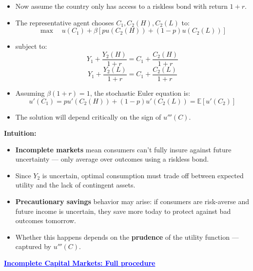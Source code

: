 \documentclass[12pt]{article}
\begin{document}
\begin{itemize}
    \item Now assume the country only has access to a riskless bond with return $1 + r$.
    \item The representative agent chooses $C_1, C_2(H), C_2(L)$ to:
    \[
    \max \quad u(C_1) + \beta \left[ pu(C_2(H)) + (1-p)u(C_2(L)) \right]
    \]
    \item subject to:
    \[
    Y_1 + \frac{Y_2(H)}{1+r} = C_1 + \frac{C_2(H)}{1+r}
    \]
    \[
    Y_1 + \frac{Y_2(L)}{1+r} = C_1 + \frac{C_2(L)}{1+r}
    \]
    \item Assuming $\beta(1+r) = 1$, the stochastic Euler equation is:
    \[
    u'(C_1) = pu'(C_2(H)) + (1-p)u'(C_2(L)) = \mathbb{E}[u'(C_2)]
    \]
    \item The solution will depend critically on the sign of $u'''(C)$.
\end{itemize}

\vspace{1em}
\textbf{Intuition:}
\begin{itemize}
    \item \textbf{Incomplete markets} mean consumers can’t fully insure against future uncertainty — only average over outcomes using a riskless bond.
    \item Since $Y_2$ is uncertain, optimal consumption must trade off between expected utility and the lack of contingent assets.
    \item \textbf{Precautionary savings} behavior may arise: if consumers are risk-averse and future income is uncertain, they save more today to protect against bad outcomes tomorrow.
    \item Whether this happens depends on the \textbf{prudence} of the utility function — captured by $u'''(C)$.
\end{itemize}

\textcolor{blue}{\textbf{\uline{Incomplete Capital Markets: Full procedure}}}
\end{document}
